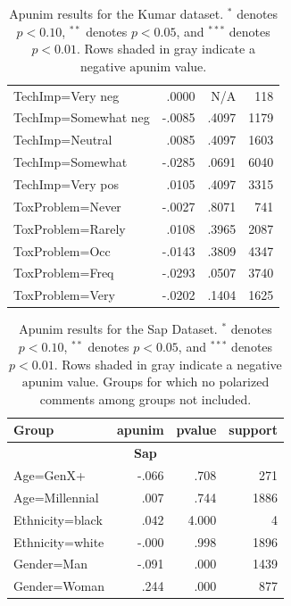 \documentclass[11pt]{article}
\theoremstyle{definition}
\theoremstyle{plain}
\begin{document}
\begin{table}[t]
\begin{tabularx}{\columnwidth}{X r r r}
		TechImp=Very neg & .0000 & N/A & 118 \\
		\rowcolor{gray!15}
		TechImp=Somewhat neg & -.0085 & .4097 & 1179 \\
		TechImp=Neutral & .0085 & .4097 & 1603 \\
		\rowcolor{gray!15}
		TechImp=Somewhat & -.0285 & .0691 & 6040 \\
		TechImp=Very pos& .0105 & .4097 & 3315 \\
		\rowcolor{gray!15}
		ToxProblem=Never & -.0027 & .8071 & 741 \\
		ToxProblem=Rarely & .0108 & .3965 & 2087 \\
		\rowcolor{gray!15}
		ToxProblem=Occ & -.0143 & .3809 & 4347 \\
		\rowcolor{gray!15}
		ToxProblem=Freq & -.0293 & .0507 & 3740 \\
		\rowcolor{gray!15}
		ToxProblem=Very & -.0202 & .1404 & 1625 \\
		
		\bottomrule
	\end{tabularx}
	\caption{Apunim results for the Kumar dataset. $^{*}$ denotes $p<0.10$, $^{**}$ denotes $p<0.05$, and $^{***}$ denotes $p<0.01$. Rows shaded in gray indicate a negative $\text{apunim}$ value.}
	\label{tab:sdb-features}
\end{table}

\begin{table}[t]
	\small
	\centering
	
	\begin{tabularx}{\columnwidth}{X r r r}
		\toprule
		\textbf{Group} & \textbf{apunim} & \textbf{pvalue} & \textbf{support} \\
		\midrule
		
		\multicolumn{4}{c}{\textbf{Sap}} \\
		\midrule
		\rowcolor{gray!15}
		Age=GenX+ & -.066 & .708 & 271 \\
		Age=Millennial & .007 & .744 & 1886 \\
		Ethnicity=black & .042 & 4.000 & 4 \\
		\rowcolor{gray!15}
		Ethnicity=white & -.000 & .998 & 1896 \\
		\rowcolor{gray!15}
		Gender=Man & -.091 & .000 & 1439 \\
		Gender=Woman & .244 & .000 & 877 \\
		
		\bottomrule
	\end{tabularx}
	\caption{Apunim results for the Sap Dataset. $^{*}$ denotes $p<0.10$, $^{**}$ denotes $p<0.05$, and $^{***}$ denotes $p<0.01$.  Rows shaded in gray indicate a negative $\text{apunim}$ value. Groups for which no polarized comments among groups not included.}
	\label{tab:sap-full}
\end{table}
\end{document}
